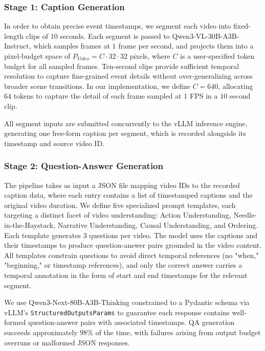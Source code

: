 \documentclass[sigconf,natbib=false,nonacm]{acmart}
\begin{document}
\subsubsection{Stage 1: Caption Generation}

In order to obtain precise event timestamps, we segment each video into fixed-length clips of $10$ seconds. Each segment is passed to Qwen3-VL-30B-A3B-Instruct, which samples frames at $1$ frame per second, and projects them into a pixel-budget space of $P_{Video} = C \cdot 32 \cdot 32$ pixels, where $C$ is a user-specified token budget for all sampled frames. Ten-second clips provide sufficient temporal resolution to capture fine-grained event details without over-generalizing across broader scene transitions. In our implementation, we define $C = 640$, allocating $64$ tokens to capture the detail of each frame sampled at $1$ FPS in a $10$ second clip.

All segment inputs are submitted concurrently to the vLLM inference engine, generating one free-form caption per segment, which is recorded alongside its timestamp and source video ID.

\subsubsection{Stage 2: Question-Answer Generation}
 
The pipeline takes as input a JSON file mapping video IDs to the recorded caption data, where each entry contains a list of timestamped captions and the original video duration. We define five specialized prompt templates, each targeting a distinct facet of video understanding: Action Understanding, Needle-in-the-Haystack, Narrative Understanding, Causal Understanding, and Ordering. Each template generates 3 questions per video. The model uses the captions and their timestamps to produce question-answer pairs grounded in the video content. All templates constrain questions to avoid direct temporal references (no "when," "beginning," or timestamp references), and only the correct answer carries a temporal annotation in the form of start and end timestamps for the relevant segment. 

We use Qwen3-Next-80B-A3B-Thinking \cite{qwen3} constrained to a Pydantic schema via vLLM's \texttt{StructuredOutputsParams} to guarantee each response contains well-formed question-answer pairs with associated timestamps. QA generation succeeds approximately $98\%$ of the time, with failures arising from output budget overruns or malformed JSON responses.
\end{document}
